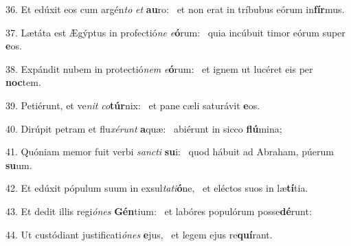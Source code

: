 36. Et edúxit eos cum argén\textit{to} \textit{et} \textbf{au}ro: \ast\  et non erat in tríbubus eórum in\textbf{fír}mus.\

37. Lætáta est Ægýptus in profectió\textit{ne} \textit{e}\textbf{ó}rum: \ast\  quia incúbuit timor eórum super \textbf{e}os.\

38. Expándit nubem in protectió\textit{nem} \textit{e}\textbf{ó}rum: \ast\  et ignem ut lucéret eis per \textbf{noc}tem.\

39. Petiérunt, et ve\textit{nit} \textit{co}\textbf{túr}nix: \ast\  et pane cæli saturávit \textbf{e}os.\

40. Dirúpit petram et flu\textit{xé}\textit{runt} \textbf{a}quæ: \ast\  abiérunt in sicco \textbf{flú}mina;\

41. Quóniam memor fuit verbi \textit{sanc}\textit{ti} \textbf{su}i: \ast\  quod hábuit ad Abraham, púerum \textbf{su}um.\

42. Et edúxit pópulum suum in exsul\textit{ta}\textit{ti}\textbf{ó}ne, \ast\  et eléctos suos in læ\textbf{tí}tia.\

43. Et dedit illis regi\textit{ó}\textit{nes} \textbf{Gén}tium: \ast\  et labóres populórum posse\textbf{dé}runt:\

44. Ut custódiant justificati\textit{ó}\textit{nes} \textbf{e}jus, \ast\  et legem ejus re\textbf{quí}rant.\

